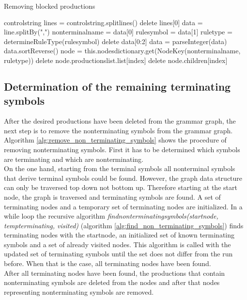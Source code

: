 \begin{algorithm}[H]
\caption{Removing blocked productions}
\begin{algorithmic}[1] 
\Require control\textunderscore string
\State lines = control\textunderscore string.splitlines()
\State delete lines[0]
	\State data = line.splitBy(",")
	\State nonterminal\textunderscore name = data[0] 
	\State rule\textunderscore symbol = data[1]
	\State rule\textunderscore type = determineRuleType(rule\textunderscore symbol)
	\State delete data[0:2]
	\State data = parseInteger(data)
	\State data.sortReverse()
	\State node = this.nodes\textunderscore dictionary.get(Node\textunderscore Key(nonterminal\textunderscore name, rule\textunderscore type))
		\State delete node.productions\textunderscore list.list[index]
		\State delete node.children[index]
	\EndFor
\EndFor
\end{algorithmic}
\label{alg:remove_blocked_productions}
\end{algorithm}

\subsection{Determination of the remaining terminating symbols}

After the desired productions have been deleted from the grammar graph, the next step is to remove the nonterminating symbols from the grammar graph. Algorithm \ref{alg:remove_non_terminating_symbols} shows the procedure of removing nonterminating symbols.
First it has to be determined which symbols are terminating and which are nonterminating. \\
On the one hand, starting from the terminal symbols all nonterminal symbols that derive terminal symbols could be found. However, the graph data structure can only be traversed top down not bottom up.
Therefore starting at the start node, the graph is traversed and terminating symbols are found. 
A set of terminating nodes and a temporary set of terminating nodes are initialized.
In a while loop the recursive algorithm \textit{find\textunderscore non\textunderscore terminating\textunderscore symbols(start\textunderscore node, temp\textunderscore terminating, visited)} (algorithm \ref{alg:find_non_terminating_symbols}) finds terminating nodes with the start\textunderscore node, an initialized set of known terminating symbols and a set of already visited nodes.
This algorithm is called with the updated set of terminating symbols until the set does not differ from the run before.
When that is the case, all terminating nodes have been found.\\
After all terminating nodes have been found, the productions that contain nonterminating symbols are deleted from the nodes and after that nodes representing nonterminating symbols are removed.

